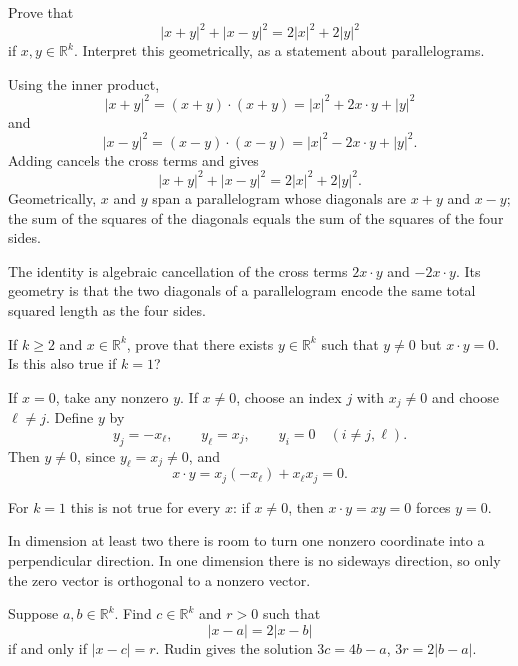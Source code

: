 \documentclass[main.tex]{subfiles}
\begin{document}
Prove that
\[
|x+y|^2+|x-y|^2=2|x|^2+2|y|^2
\]
if $x,y\in\mathbb R^k$. Interpret this geometrically, as a statement about parallelograms.

\begin{SolutionBlue}
Using the inner product,
\[
|x+y|^2=(x+y)\cdot(x+y)=|x|^2+2x\cdot y+|y|^2
\]
and
\[
|x-y|^2=(x-y)\cdot(x-y)=|x|^2-2x\cdot y+|y|^2.
\]
Adding cancels the cross terms and gives
\[
|x+y|^2+|x-y|^2=2|x|^2+2|y|^2.
\]
Geometrically, $x$ and $y$ span a parallelogram whose diagonals are $x+y$ and $x-y$; the sum of the
squares of the diagonals equals the sum of the squares of the four sides.
\end{SolutionBlue}

\begin{Reflection}
The identity is algebraic cancellation of the cross terms $2x\cdot y$ and $-2x\cdot y$. Its geometry
is that the two diagonals of a parallelogram encode the same total squared length as the four sides.
\end{Reflection}

If $k\ge2$ and $x\in\mathbb R^k$, prove that there exists $y\in\mathbb R^k$ such that $y\neq0$ but
$x\cdot y=0$. Is this also true if $k=1$?

\begin{SolutionBlue}
If $x=0$, take any nonzero $y$. If $x\neq0$, choose an index $j$ with $x_j\neq0$ and choose
$\ell\neq j$. Define $y$ by
\[
y_j=-x_\ell,\qquad y_\ell=x_j,\qquad y_i=0\quad(i\neq j,\ell).
\]
Then $y\neq0$, since $y_\ell=x_j\neq0$, and
\[
x\cdot y=x_j(-x_\ell)+x_\ell x_j=0.
\]

For $k=1$ this is not true for every $x$: if $x\neq0$, then $x\cdot y=xy=0$ forces $y=0$.
\end{SolutionBlue}

\begin{Reflection}
In dimension at least two there is room to turn one nonzero coordinate into a perpendicular direction.
In one dimension there is no sideways direction, so only the zero vector is orthogonal to a nonzero
vector.
\end{Reflection}

Suppose $a,b\in\mathbb R^k$. Find $c\in\mathbb R^k$ and $r>0$ such that
\[
|x-a|=2|x-b|
\]
if and only if $|x-c|=r$. Rudin gives the solution $3c=4b-a$, $3r=2|b-a|$.
\end{document}
